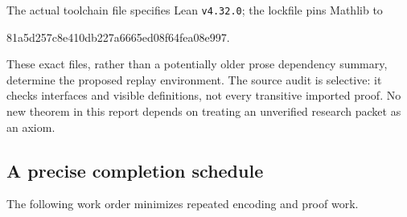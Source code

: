 The actual toolchain file specifies Lean \texttt{v4.32.0}; the lockfile pins Mathlib to
\begin{center}\small\ttfamily 81a5d257c8e410db227a6665ed08f64fea08e997.\end{center}
These exact files, rather than a potentially older prose dependency summary, determine the proposed replay environment. The source audit is selective: it checks interfaces and visible definitions, not every transitive imported proof. No new theorem in this report depends on treating an unverified research packet as an axiom.

\subsection{A precise completion schedule}
The following work order minimizes repeated encoding and proof work.
